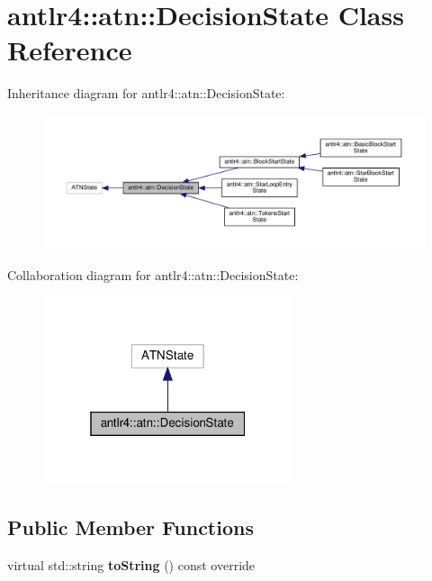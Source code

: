 \hypertarget{classantlr4_1_1atn_1_1DecisionState}{}\section{antlr4\+:\+:atn\+:\+:Decision\+State Class Reference}
\label{classantlr4_1_1atn_1_1DecisionState}


Inheritance diagram for antlr4\+:\+:atn\+:\+:Decision\+State\+:
\nopagebreak
\begin{figure}[H]
\begin{center}
\leavevmode
\includegraphics[width=350pt]{classantlr4_1_1atn_1_1DecisionState__inherit__graph}
\end{center}
\end{figure}


Collaboration diagram for antlr4\+:\+:atn\+:\+:Decision\+State\+:
\nopagebreak
\begin{figure}[H]
\begin{center}
\leavevmode
\includegraphics[width=208pt]{classantlr4_1_1atn_1_1DecisionState__coll__graph}
\end{center}
\end{figure}
\subsection*{Public Member Functions}
\begin{DoxyCompactItemize}
\item 
\mbox{\label{classantlr4_1_1atn_1_1DecisionState_a30e21564791b80bbe0cd93d4444a29de}} 
virtual std\+::string {\bfseries to\+String} () const override
\end{DoxyCompactItemize}
